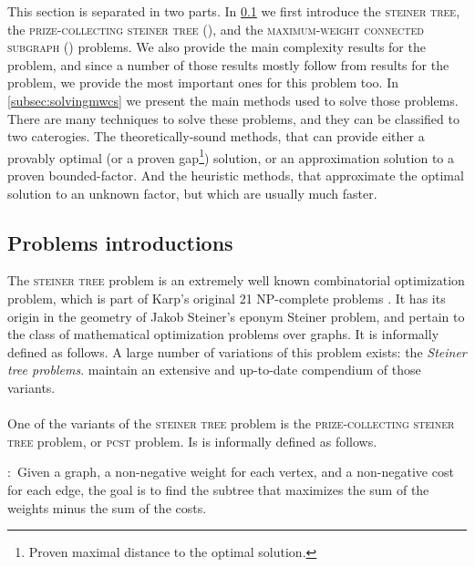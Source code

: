 	This section is separated in two parts.
	In \cref{subsec:mwcsintro} we first introduce the \textsc{steiner tree}, the \textsc{prize-collecting steiner tree} (\pcst{}), and the \textsc{maximum-weight connected subgraph} (\mwcs{}) problems.
	We also provide the main complexity results for the \mwcs{} problem, and since a number of those results mostly follow from results for the \pcst{} problem, we provide the most important ones for this problem too.
	In \cref{subsec:solvingmwcs} we present the main methods used to solve those problems.
	There are many techniques to solve these problems, and they can be classified to two caterogies.
	The theoretically-sound methods, that can provide either a provably optimal (or a proven gap\footnote{Proven maximal distance to the optimal solution.}) solution, or an approximation solution to a proven bounded-factor.
	And the heuristic methods, that approximate the optimal solution to an unknown factor, but which are usually much faster.

	\subsection{Problems introductions}
	\label{subsec:mwcsintro}

	The \textsc{steiner tree} problem is an extremely well known combinatorial optimization problem, which is part of Karp's original 21 NP-complete problems \parencite{karp1972reducibility}.
	It has its origin in the geometry of Jakob Steiner's eponym Steiner problem, and pertain to the class of mathematical optimization problems over graphs.
	It is informally defined as follows.
	A large number of variations of this problem exists: the \emph{Steiner tree problems}.
	\Textcite{hauptmann2014compendium} maintain an extensive and up-to-date compendium of those variants.

	\paragraph{}
	One of the variants of the \textsc{steiner tree} problem is the \textsc{prize-collecting steiner tree} problem, or \textsc{pcst} problem.
	Is is informally defined as follows.

	\textbf{\pcst{}$\colon$} Given a graph, a non-negative weight for each vertex, and a non-negative cost for each edge, the goal is to find the subtree that maximizes the sum of the weights minus the sum of the costs.

